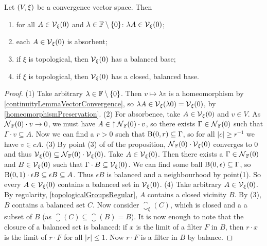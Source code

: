 \begin{corollary} \label{vicinityFilterAtOrigin}
Let $\left( V, \xi \right)$ be a convergence vector space. Then
\begin{enumerate}
\item for all $A\in \operatorname{\mathcal{V}}_\xi(0)$ and $\lambda\in \mathbb{F}\setminus\{0\}$: $\lambda A\in \operatorname{\mathcal{V}}_\xi(0)$;
\item each $A \in \operatorname{\mathcal{V}}_\xi(0)$ is absorbent;
\item if $\xi$ is topological, then $\operatorname{\mathcal{V}}_\xi(0)$ has a balanced base;
\item if $\xi$ is topological, then $\operatorname{\mathcal{V}}_\xi(0)$ has a closed, balanced base.
\end{enumerate}
\end{corollary}
\begin{proof}
(1) Take arbitrary $\lambda\in\mathbb{F}\setminus\{0\}$. Then $v\mapsto \lambda v$ is a homeomorphism by \ref{continuityLemmaVectorConvergence}, so $\lambda A \in \operatorname{\mathcal{V}}_\xi(\lambda 0) = \operatorname{\mathcal{V}}_\xi(0)$, by \ref{homeomorphismPreservation}.
(2) For absorbence, take $A\in \operatorname{\mathcal{V}}_\xi(0)$ and $v\in V$. As $\operatorname{\mathcal{N}}_{\mathbb{F}}(0)\cdot v \to 0$, we must have $A\in \operatorname{\uparrow}\operatorname{\mathcal{N}}_{\mathbb{F}}(0)\cdot v$, so there exists $\Gamma \in \operatorname{\mathcal{N}}_{\mathbb{F}}(0)$ such that $\Gamma\cdot v \subseteq A$. Now we can find a $r>0$ such that $\operatorname{B}(0,r)\subseteq \Gamma$, so for all $|c|\geq r^{-1}$ we have $v\in cA$.
(3) By point (3) of of the proposition, $\operatorname{\mathcal{N}}_{\mathbb{F}}(0)\cdot \operatorname{\mathcal{V}}_\xi(0)$ converges to $0$ and thus $\operatorname{\mathcal{V}}_\xi(0) \subseteq \operatorname{\mathcal{N}}_{\mathbb{F}}(0)\cdot\operatorname{\mathcal{V}}_\xi(0)$. Take $A\in \operatorname{\mathcal{V}}_\xi(0)$. Then there exists a $\Gamma\in\operatorname{\mathcal{N}}_{\mathbb{F}}(0)$ and $B\in \operatorname{\mathcal{V}}_\xi(0)$ such that $\Gamma\cdot B \subseteq \operatorname{\mathcal{V}}_\xi(0)$. We can find some ball $\operatorname{B}(0,\epsilon) \subseteq \Gamma$, so $\operatorname{B}(0,1)\cdot \epsilon B\subseteq \epsilon B \subseteq A$. Thus $\epsilon B$ is balanced and a neighbourhood by point(1). So every $A\in \operatorname{\mathcal{V}}_\xi(0)$ contains a balanced set in $\operatorname{\mathcal{V}}_\xi(0)$.
(4) Take arbitrary $A\in \operatorname{\mathcal{V}}_\xi(0)$. By regularity, \ref{topologicalGroupsRegular}, $A$ contains a closed vicinity $B$. By (3), $B$ contains a balanced set $C$. Now consider $\closure_\xi(C)$, which is closed and a a subset of $B$ (as $\closure(C)\subseteq \closure(B) = B$). It is now enough to note that the closure of a balanced set is balanced: if $x$ is the limit of a filter $F$ in $B$, then $r\cdot x$ is the limit of $r\cdot F$ for all $|r|\leq 1$. Now $r\cdot F$ is a filter in $B$ by balance.
\end{proof}

